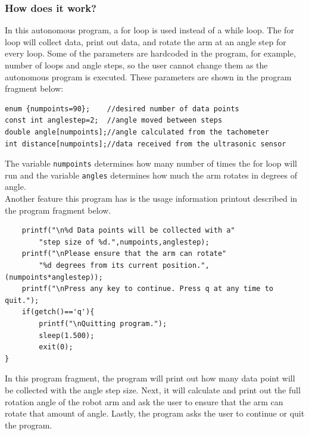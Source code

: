 \documentclass[12pt]{article}
\begin{document}
\subsubsection*{How does it work?}
In this autonomous program, a for loop is used instead of a while loop.
The for loop will collect data, print out data, and rotate the arm at an angle step for every
    loop.
Some of the parameters are hardcoded in the program, for example, number of loops and angle steps,
    so the user cannot change them as the autonomous program is executed.
These parameters are shown in the program fragment below:
\begin{verbatim}
enum {numpoints=90};    //desired number of data points
const int anglestep=2;	//angle moved between steps
double angle[numpoints];//angle calculated from the tachometer
int distance[numpoints];//data received from the ultrasonic sensor
\end{verbatim}
The variable \verb+numpoints+ determines how many number of times the for loop will run and
    the variable \verb+angles+ determines how much the arm rotates in degrees of angle.
\\
Another feature this program has is the usage information printout described in the program fragment below.
\begin{verbatim}
    printf("\n%d Data points will be collected with a"
        "step size of %d.",numpoints,anglestep);
    printf("\nPlease ensure that the arm can rotate"
        "%d degrees from its current position.",(numpoints*anglestep));
    printf("\nPress any key to continue. Press q at any time to quit.");
    if(getch()=='q'){
        printf("\nQuitting program.");
        sleep(1.500);
        exit(0);
}
\end{verbatim}
In this program fragment, the program will print out how many data point will be collected
    with the angle step size.
Next, it will calculate and print out the full rotation angle of the robot arm and ask the
    user to ensure that the arm can rotate that amount of angle.
Lastly, the program asks the user to continue or quit the program.
\end{document}
